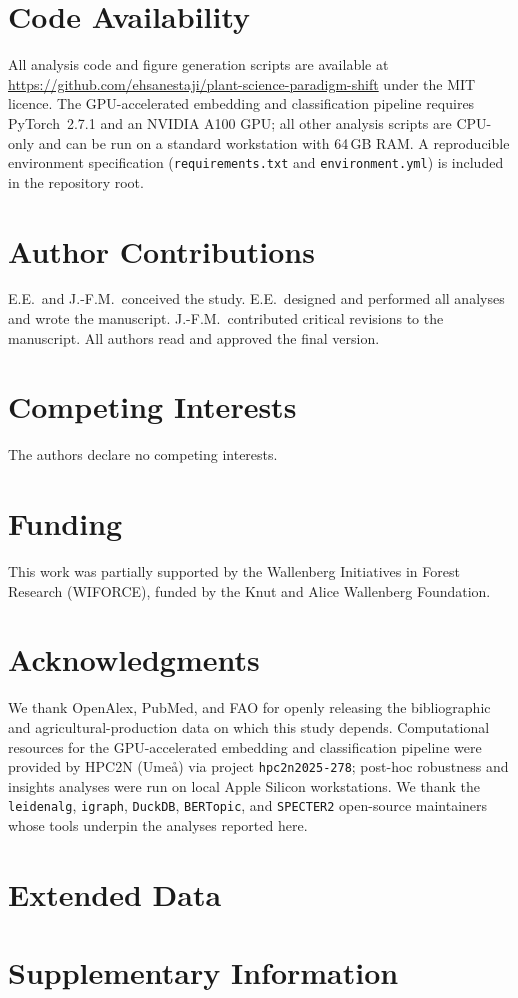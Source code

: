 \documentclass[11pt,a4paper]{article}
\begin{document}
\section*{Code Availability}
All analysis code and figure generation scripts
are available at
\url{https://github.com/ehsanestaji/plant-science-paradigm-shift}
under the MIT licence.
The GPU-accelerated embedding and classification pipeline requires
PyTorch~2.7.1 and an NVIDIA A100 GPU; all other analysis scripts are
CPU-only and can be run on a standard workstation with 64\,GB RAM.
A reproducible environment specification (\texttt{requirements.txt} and
\texttt{environment.yml}) is included in the repository root.

\section*{Author Contributions}
E.E.\ and J.-F.M.\ conceived the study. E.E.\ designed and performed all
analyses and wrote the manuscript. J.-F.M.\ contributed critical revisions
to the manuscript. All authors read and approved the final version.

\section*{Competing Interests}
The authors declare no competing interests.

\section*{Funding}
This work was partially supported by the Wallenberg Initiatives in Forest
Research (WIFORCE), funded by the Knut and Alice Wallenberg Foundation.

\section*{Acknowledgments}
We thank OpenAlex, PubMed, and FAO for openly releasing the
bibliographic and agricultural-production data on which this study
depends. Computational resources for the GPU-accelerated embedding
and classification pipeline were provided by HPC2N (Umeå) via
project \texttt{hpc2n2025-278}; post-hoc robustness and insights
analyses were run on local Apple Silicon workstations. We thank the
\texttt{leidenalg}, \texttt{igraph}, \texttt{DuckDB}, \texttt{BERTopic},
and \texttt{SPECTER2} open-source maintainers whose tools underpin
the analyses reported here.

\clearpage
\section*{Extended Data}


\clearpage


\clearpage
\appendix
\section*{Supplementary Information}

\end{document}
